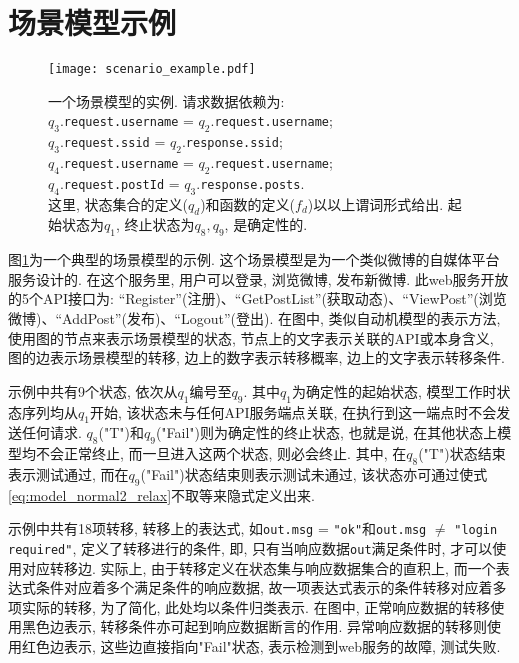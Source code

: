     \section{场景模型示例}
        \begin{figure}[!htb]
            \centering
            \texttt{[image: scenario\_example.pdf]}
            \caption[一个场景模型的实例]{一个场景模型的实例. 请求数据依赖为: \\
            $q_3$.\texttt{request.username} = $q_2$.\texttt{request.username};\\
            $q_3$.\texttt{request.ssid} = $q_2$.\texttt{response.ssid};\\
            $q_4$.\texttt{request.username} = $q_2$.\texttt{request.username};\\
            $q_4$.\texttt{request.postId} = $q_3$.\texttt{response.posts}.\\
            这里, 状态集合的定义($q_d$)和函数的定义($f_d$)以以上谓词形式给出. 起始状态为$q_1$, 终止状态为$q_8, q_9$, 是确定性的.}
            \label{fig:scenario_example}
        \end{figure}
        
        图\ref{fig:scenario_example}为一个典型的场景模型的示例. 这个场景模型是为一个类似微博的自媒体平台服务设计的. 在这个服务里, 用户可以登录, 浏览微博, 发布新微博. 此web服务开放的5个API接口为: “Register”(注册)、“GetPostList”(获取动态)、“ViewPost”(浏览微博)、“AddPost”(发布)、“Logout”(登出). 在图中, 类似自动机模型的表示方法, 使用图的节点来表示场景模型的状态, 节点上的文字表示关联的API或本身含义, 图的边表示场景模型的转移, 边上的数字表示转移概率, 边上的文字表示转移条件.
        
        示例中共有9个状态, 依次从$q_1$编号至$q_9$. 其中$q_1$为确定性的起始状态, 模型工作时状态序列均从$q_1$开始, 该状态未与任何API服务端点关联, 在执行到这一端点时不会发送任何请求. $q_8$("T")和$q_9$("Fail")则为确定性的终止状态, 也就是说, 在其他状态上模型均不会正常终止, 而一旦进入这两个状态, 则必会终止. 其中, 在$q_8$("T")状态结束表示测试通过, 而在$q_9$("Fail")状态结束则表示测试未通过, 该状态亦可通过使式\ref{eq:model_normal2_relax}不取等来隐式定义出来.
        
        示例中共有18项转移, 转移上的表达式, 如\texttt{out.msg} = \texttt{"ok"}和\texttt{out.msg} $\neq$ \texttt{"login required"}, 定义了转移进行的条件, 即, 只有当响应数据\texttt{out}满足条件时, 才可以使用对应转移边. 实际上, 由于转移定义在状态集与响应数据集合的直积上, 而一个表达式条件对应着多个满足条件的响应数据, 故一项表达式表示的条件转移对应着多项实际的转移, 为了简化, 此处均以条件归类表示. 在图中, 正常响应数据的转移使用黑色边表示, 转移条件亦可起到响应数据断言的作用. 异常响应数据的转移则使用红色边表示, 这些边直接指向"Fail"状态, 表示检测到web服务的故障, 测试失败.
        
